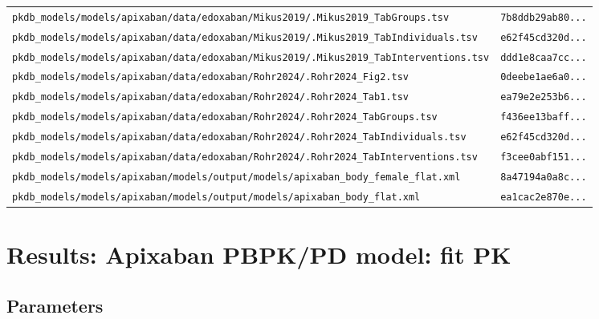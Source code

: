 \documentclass{article}
\begin{document}
\begin{longtable}{ll}
\texttt{pkdb\_models/models/apixaban/data/edoxaban/Mikus2019/.Mikus2019\_TabGroups.tsv} & \texttt{7b8ddb29ab80...} \\
\texttt{pkdb\_models/models/apixaban/data/edoxaban/Mikus2019/.Mikus2019\_TabIndividuals.tsv} & \texttt{e62f45cd320d...} \\
\texttt{pkdb\_models/models/apixaban/data/edoxaban/Mikus2019/.Mikus2019\_TabInterventions.tsv} & \texttt{ddd1e8caa7cc...} \\
\texttt{pkdb\_models/models/apixaban/data/edoxaban/Rohr2024/.Rohr2024\_Fig2.tsv} & \texttt{0deebe1ae6a0...} \\
\texttt{pkdb\_models/models/apixaban/data/edoxaban/Rohr2024/.Rohr2024\_Tab1.tsv} & \texttt{ea79e2e253b6...} \\
\texttt{pkdb\_models/models/apixaban/data/edoxaban/Rohr2024/.Rohr2024\_TabGroups.tsv} & \texttt{f436ee13baff...} \\
\texttt{pkdb\_models/models/apixaban/data/edoxaban/Rohr2024/.Rohr2024\_TabIndividuals.tsv} & \texttt{e62f45cd320d...} \\
\texttt{pkdb\_models/models/apixaban/data/edoxaban/Rohr2024/.Rohr2024\_TabInterventions.tsv} & \texttt{f3cee0abf151...} \\
\texttt{pkdb\_models/models/apixaban/models/output/models/apixaban\_body\_female\_flat.xml} & \texttt{8a47194a0a8c...} \\
\texttt{pkdb\_models/models/apixaban/models/output/models/apixaban\_body\_flat.xml} & \texttt{ea1cac2e870e...} \\
\end{longtable}

\section{Results: Apixaban PBPK/PD model: fit PK}

\subsection{Parameters}
\end{document}
